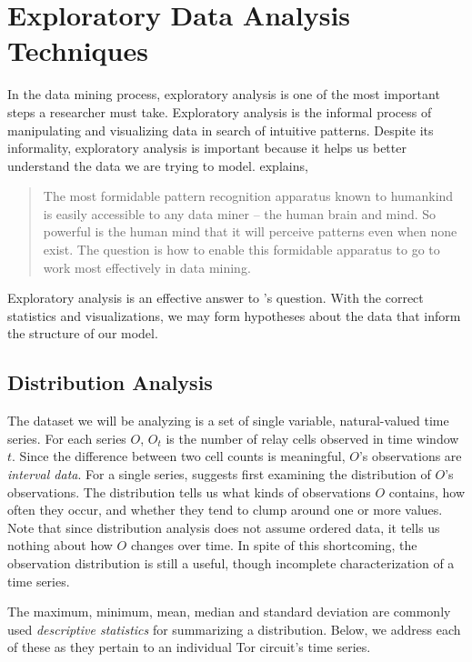 \chapter{Exploratory Data Analysis Techniques}
In the data mining process, exploratory analysis is one of the most important steps a researcher must take. Exploratory analysis is the informal process of manipulating and visualizing data in search of intuitive patterns. Despite its informality, exploratory analysis is important because it helps us better understand the data we are trying to model. \citet{pyle} explains,
\begin{quote}
The most formidable pattern recognition apparatus known to humankind is easily accessible to any data miner -- the human brain and mind. So powerful is the human mind that it will perceive patterns even when none exist. The question is how to enable this formidable apparatus to go to work most effectively in data mining.
\end{quote}
 Exploratory analysis is an effective answer to \citeauthor{pyle}'s question. With the correct statistics and visualizations, we may form hypotheses about the data that inform the structure of our model.

\section{Distribution Analysis}
The dataset we will be analyzing is a set of single variable, natural-valued time series. For each series $O$, $O_t$ is the number of relay cells observed in time window $t$. Since the difference between two cell counts is meaningful, $O$'s observations are \textit{interval data}. For a single series, \citet{warner} suggests first examining the distribution of $O$'s observations. The distribution tells us what kinds of observations $O$ contains, how often they occur, and whether they tend to clump around one or more values. Note that since distribution analysis does not assume ordered data, it tells us nothing about how $O$ changes over time. In spite of this shortcoming, the observation distribution is still a useful, though incomplete characterization of a time series.

 The maximum, minimum, mean, median and standard deviation are commonly used \textit{descriptive statistics} for summarizing a distribution. Below, we address each of these as they pertain to an individual Tor circuit's time series.

